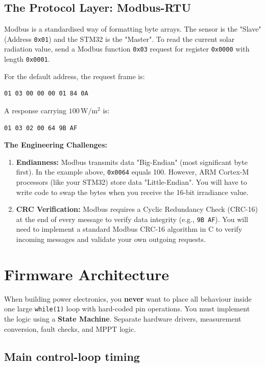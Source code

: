 \documentclass[11pt,a4paper]{article}
\newcommand{\code}[1]{\texttt{#1}}
\let\originalsection\section
\renewcommand{\section}{\clearpage\originalsection}
\begin{document}
\subsection{The Protocol Layer: Modbus-RTU}

Modbus is a standardised way of formatting byte arrays. The sensor is the "Slave" (Address \code{0x01}) and the STM32 is the "Master". To read the current solar radiation value, send a Modbus function \code{0x03} request for register \code{0x0000} with length \code{0x0001}. 

For the default address, the request frame is:
\begin{lstlisting}[caption={SEN0640 read-irradiance request bytes}]
01 03 00 00 00 01 84 0A
\end{lstlisting}

A response carrying $100\,\mathrm{W/m^2}$ is:
\begin{lstlisting}[caption={Example SEN0640 response bytes}]
01 03 02 00 64 9B AF
\end{lstlisting}

\textbf{The Engineering Challenges:}
\begin{enumerate}
    \item \textbf{Endianness:} Modbus transmits data "Big-Endian" (most significant byte first). In the example above, \code{0x0064} equals 100. However, ARM Cortex-M processors (like your STM32) store data "Little-Endian". You will have to write code to swap the bytes when you receive the 16-bit irradiance value.
    \item \textbf{CRC Verification:} Modbus requires a Cyclic Redundancy Check (CRC-16) at the end of every message to verify data integrity (e.g., \code{9B AF}). You will need to implement a standard Modbus CRC-16 algorithm in C to verify incoming messages and validate your own outgoing requests.
\end{enumerate}


\section{Firmware Architecture}

When building power electronics, you \textbf{never} want to place all behaviour inside one large \code{while(1)} loop with hard-coded pin operations. You must implement the logic using a \textbf{State Machine}. Separate hardware drivers, measurement conversion, fault checks, and MPPT logic. 

\subsection{Main control-loop timing}
\end{document}
